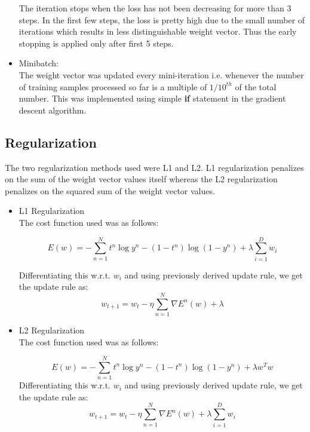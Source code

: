 \documentclass[11pt,twoside]{article}
\begin{document}
\begin{itemize}
The iteration stops when the loss has not been decreasing for more than 3 steps. In the first few steps, the loss is pretty high due to the small number of iterations which results in less distinguishable weight vector. Thus the early stopping is applied only after first 5 steps.\\

\item Minibatch:\\
The weight vector was updated every mini-iteration i.e. whenever the number of training samples processed so far is a multiple of $1/10 ^{th}$ of the total number. This was implemented using simple \textbf{if} statement in the gradient descent algorithm.\\

\end{itemize}



\subsection{Regularization}
The two regularization methods used were L1 and L2. L1 regularization penalizes on the sum of the weight vector values itself whereas the L2 regularization penalizes on the squared sum of the weight vector values.

\begin{itemize}

\item{L1 Regularization}\\
The cost function used was  as follows:

\begin{equation}
E(w) = -\sum_{n = 1}^{N} t^{n}\log y^{n} - (1 - t^{n})\log (1 - y^n) + \lambda\sum_{i = 1}^{D}w_{i}
\end{equation}

Differentiating this w.r.t. $w_{i}$ and using previously derived update rule, we get the update rule as:
\begin{equation}
w_{t+1} = w_{t} - \eta \sum_{n = 1}^{N} \nabla E^{n}(w) + \lambda
\end{equation}

\item{L2 Regularization}\\
The cost function used was as follows:

\begin{equation}
E(w) = -\sum_{n = 1}^{N} t^{n}\log y^{n} - (1 - t^{n})\log (1 - y^n) + \lambda w^{T}w
\end{equation}
Differentiating this w.r.t. $w_{i}$ and using previously derived update rule, we get the update rule as:
\begin{equation}
w_{t+1} = w_{t} - \eta \sum_{n = 1}^{N} \nabla E^{n}(w) +\lambda\sum_{i = 1}^{D}w_{i}
\end{equation}
\end{itemize}
\end{document}
